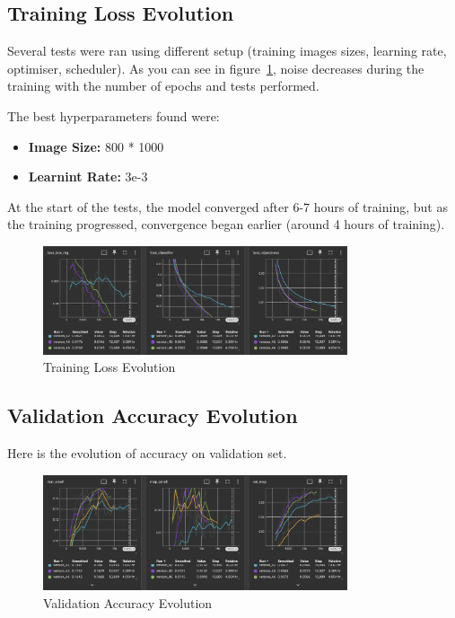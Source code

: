 \documentclass[12pt,oneside]{book} %
\begin{document}
\subsection{Training Loss Evolution}

Several tests were ran using different setup (training images sizes, learning
rate, optimiser, scheduler). As you can see in figure~\ref{fig:training_loss},
noise decreases during the training with the number of epochs and tests
performed.

The best hyperparameters found were:
\begin{itemize}
    \item \textbf{Image Size:} 800 * 1000
    \item \textbf{Learnint Rate:} 3e-3
\end{itemize}

At the start of the tests, the model converged after 6-7 hours of training, but
as the training progressed, convergence began earlier (around 4 hours of
training).

\begin{figure}[H]
    \centering
    \includegraphics[width=0.8\textwidth]{../results/training.png}
    \caption{Training Loss Evolution}
    \label{fig:training_loss}
\end{figure}

\newpage
\subsection{Validation Accuracy Evolution}

Here is the evolution of accuracy on validation set.

\begin{figure}[H]
    \centering
    \includegraphics[width=0.8\textwidth]{../results/validation.png}
    \caption{Validation Accuracy Evolution}
    \label{fig:annotations_per_class}
\end{figure}
\end{document}
